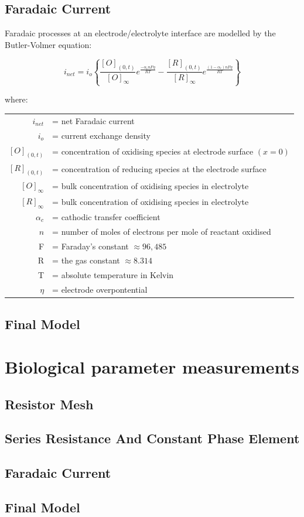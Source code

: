     \subsection{Faradaic Current}

        Faradaic processes at an electrode/electrolyte interface are modelled by the Butler-Volmer equation:

        \begin{equation}
        i_{net}=i_{o}\left\{ \frac{[O]_{(0,t)}}{[O]_{\infty}}e^{\frac{-\alpha_{c}nF\eta}{RT}}-\frac{[R]_{(0,t)}}{[R]_{\infty}}e^{\frac{(1-\alpha_{c})nF\eta}{RT}}\right\}
        \end{equation}


        where:

        \begin{tabular}{rl}
        $i_{net}$ & = net Faradaic current\tabularnewline
        $i_{o}$ & = current exchange density\tabularnewline
        $[O]_{(0,t)}$ & = concentration of oxidising species at electrode surface $(x=0)$\tabularnewline
        $[R]_{(0,t)}$ & = concentration of reducing species at the electrode surface\tabularnewline
        $[O]_{\infty}$ & = bulk concentration of oxidising species in electrolyte\tabularnewline
        $[R]_{\infty}$ & = bulk concentration of oxidising species in electrolyte\tabularnewline
        $\alpha_{c}$ & = cathodic transfer coefficient\tabularnewline
        $n$ & = number of moles of electrons per mole of reactant oxidised\tabularnewline
        F & = Faraday's constant $\approx96,485$\tabularnewline
        R & = the gas constant $\approx8.314$\tabularnewline
        T & = absolute temperature in Kelvin\tabularnewline
        $\eta$ & = electrode overpontential\tabularnewline
        \end{tabular}


    \subsection{Final Model}

\section{Biological parameter measurements}
    \label{sect:sheep_measurements}
    \subsection{Resistor Mesh}
    \subsection{Series Resistance And Constant Phase Element}
    \subsection{Faradaic Current}
    \subsection{Final Model}
